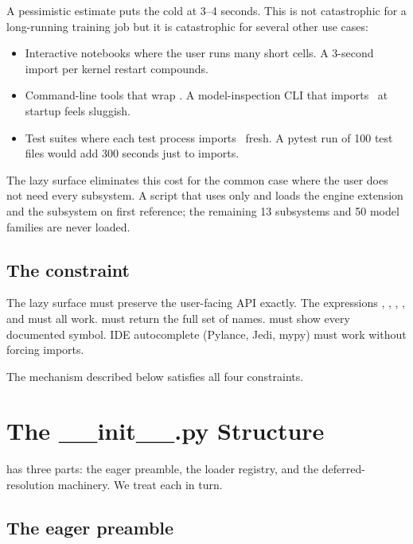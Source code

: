 A pessimistic estimate puts the cold  at 3--4
seconds. This is not catastrophic for a long-running training job
but it is catastrophic for several other use cases:

\begin{itemize}
  \item Interactive notebooks where the user runs many short
    cells. A 3-second import per kernel restart compounds.
  \item Command-line tools that wrap \Lucid. A model-inspection
    CLI that imports \Lucid\ at startup feels sluggish.
  \item Test suites where each test process imports \Lucid\
    fresh. A pytest run of 100 test files would add 300 seconds
    just to imports.
\end{itemize}

The lazy surface eliminates this cost for the common case where
the user does not need every subsystem. A script that uses only
 and  loads the engine
extension and the  subsystem on first reference; the
remaining 13 subsystems and 50 model families are never loaded.

\subsection{The constraint}
\label{ssec:lazy_imports:constraint}

The lazy surface must preserve the user-facing API exactly. The
expressions , ,
, , and
 must all work.  must
return the full set of names. \code{help(lucid)} must show every
documented symbol. IDE autocomplete (Pylance, Jedi, mypy) must
work without forcing imports.

The mechanism described below satisfies all four constraints.

\section{The \_\_init\_\_.py Structure}
\label{sec:lazy_imports:structure}

 has three parts: the eager preamble,
the loader registry, and the deferred-resolution machinery. We
treat each in turn.

\subsection{The eager preamble}
\label{ssec:lazy_imports:eager_preamble}

